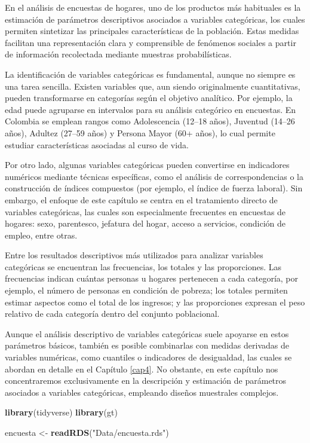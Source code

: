 \documentclass[
  spanish,
  12pt,
]{book}
\newenvironment{Shaded}{\begin{snugshade}}{\end{snugshade}}
\newcommand{\FunctionTok}[1]{\textcolor[rgb]{0.13,0.29,0.53}{\textbf{#1}}}
\newcommand{\NormalTok}[1]{#1}
\newcommand{\OtherTok}[1]{\textcolor[rgb]{0.56,0.35,0.01}{#1}}
\newcommand{\StringTok}[1]{\textcolor[rgb]{0.31,0.60,0.02}{#1}}
\begin{document}
En el análisis de encuestas de hogares, uno de los productos más habituales es la estimación de parámetros descriptivos asociados a variables categóricas, los cuales permiten sintetizar las principales características de la población. Estas medidas facilitan una representación clara y comprensible de fenómenos sociales a partir de información recolectada mediante muestras probabilísticas.

La identificación de variables categóricas es fundamental, aunque no siempre es una tarea sencilla. Existen variables que, aun siendo originalmente cuantitativas, pueden transformarse en categorías según el objetivo analítico. Por ejemplo, la edad puede agruparse en intervalos para su análisis categórico en encuestas. En Colombia se emplean rangos como Adolescencia (12--18 años), Juventud (14--26 años), Adultez (27--59 años) y Persona Mayor (60+ años), lo cual permite estudiar características asociadas al curso de vida.

Por otro lado, algunas variables categóricas pueden convertirse en indicadores numéricos mediante técnicas específicas, como el análisis de correspondencias o la construcción de índices compuestos (por ejemplo, el índice de fuerza laboral). Sin embargo, el enfoque de este capítulo se centra en el tratamiento directo de variables categóricas, las cuales son especialmente frecuentes en encuestas de hogares: sexo, parentesco, jefatura del hogar, acceso a servicios, condición de empleo, entre otras.

Entre los resultados descriptivos más utilizados para analizar variables categóricas se encuentran las frecuencias, los totales y las proporciones. Las frecuencias indican cuántas personas u hogares pertenecen a cada categoría, por ejemplo, el número de personas en condición de pobreza; los totales permiten estimar aspectos como el total de los ingresos; y las proporciones expresan el peso relativo de cada categoría dentro del conjunto poblacional.

Aunque el análisis descriptivo de variables categóricas suele apoyarse en estos parámetros básicos, también es posible combinarlas con medidas derivadas de variables numéricas, como cuantiles o indicadores de desigualdad, las cuales se abordan en detalle en el Capítulo \ref{cap4}. No obstante, en este capítulo nos concentraremos exclusivamente en la descripción y estimación de parámetros asociados a variables categóricas, empleando diseños muestrales complejos.

\begin{Shaded}
\begin{Highlighting}[]
\FunctionTok{library}\NormalTok{(tidyverse)}
\FunctionTok{library}\NormalTok{(gt)}

\NormalTok{encuesta }\OtherTok{\textless{}{-}} \FunctionTok{readRDS}\NormalTok{(}\StringTok{"Data/encuesta.rds"}\NormalTok{)}
\end{Highlighting}
\end{Shaded}
\end{document}
